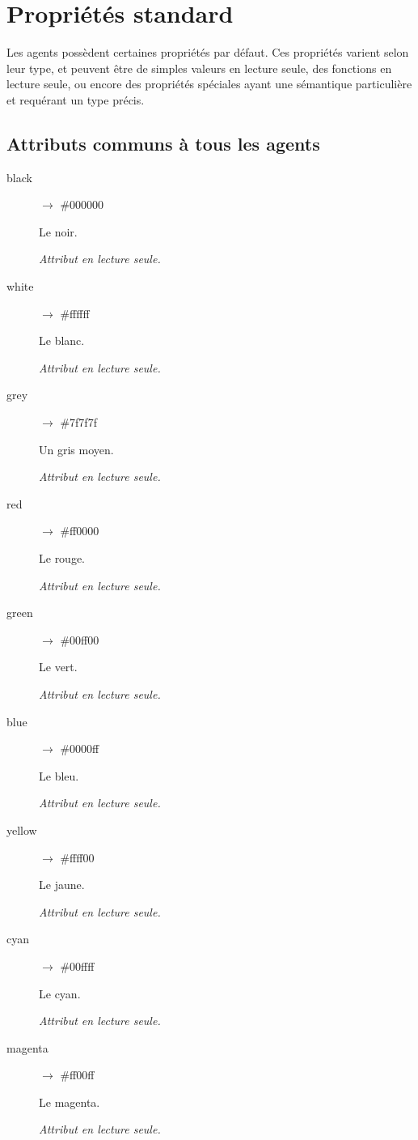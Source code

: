\section{Propriétés standard}

Les agents possèdent certaines propriétés par défaut. Ces propriétés varient selon leur type, et peuvent être de simples valeurs en lecture seule, des fonctions en lecture seule, ou encore des propriétés spéciales ayant une sémantique particulière et requérant un type précis.

\subsection{Attributs communs à tous les agents}

\begin{description}
	\item[black] $\rightarrow$ \#000000

	Le noir.

	\emph{Attribut en lecture seule.}

	\item[white] $\rightarrow$ \#ffffff

	Le blanc.

	\emph{Attribut en lecture seule.}

	\item[grey] $\rightarrow$ \#7f7f7f

	Un gris moyen.

	\emph{Attribut en lecture seule.}

	\item[red] $\rightarrow$ \#ff0000

	Le rouge.

	\emph{Attribut en lecture seule.}

	\item[green] $\rightarrow$ \#00ff00

	Le vert.

	\emph{Attribut en lecture seule.}

	\item[blue] $\rightarrow$ \#0000ff

	Le bleu.

	\emph{Attribut en lecture seule.}

	\item[yellow] $\rightarrow$ \#ffff00

	Le jaune.

	\emph{Attribut en lecture seule.}

	\item[cyan] $\rightarrow$ \#00ffff

	Le cyan.

	\emph{Attribut en lecture seule.}

	\item[magenta] $\rightarrow$ \#ff00ff

	Le magenta.

	\emph{Attribut en lecture seule.}

\end{description}

